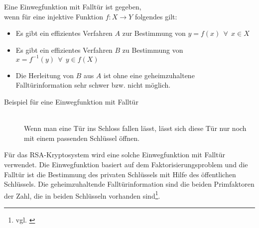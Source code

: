 \begin{Einweg}
\label{Def_Einweg_Backdoor}
Eine Einwegfunktion mit Falltür ist gegeben,\\
wenn für eine injektive Funktion \(f:X\rightarrow Y\) folgendes gilt:
\begin{itemize}
\item Es gibt ein effizientes Verfahren $A$ zur Bestimmung von $y=f(x)~~\forall~~x \in X $
\item Es gibt ein effizientes Verfahren $B$ zu Bestimmung von $x=f^{-1}(y)~~\forall~~y \in f(X)$
\item Die Herleitung von $B$ aus $A$ ist  ohne eine geheimzuhaltene\\Falltürinformation sehr schwer bzw. nicht möglich.
\end{itemize}
\end{Einweg}
\hfill
\begin{description}
\item[Beispiel für eine Einwegfunktion mit Falltür]\hfill \\
Wenn man eine Tür ins Schloss fallen lässt, lässt sich diese Tür nur noch mit einem passenden Schlüssel öffnen.
\end{description}
Für das RSA-Kryptosystem wird eine solche Einwegfunktion mit Falltür verwendet. Die Einwegfunktion basiert auf dem Faktorisierungsproblem und die Falltür ist die Bestimmung des privaten Schlüssels mit Hilfe des öffentlichen Schlüssels. Die geheimzuhaltende Falltürinformation sind die beiden Primfaktoren der Zahl, die in beiden Schlüsseln vorhanden sind\footnote{vgl. \cite{einwegfunktion}}.
